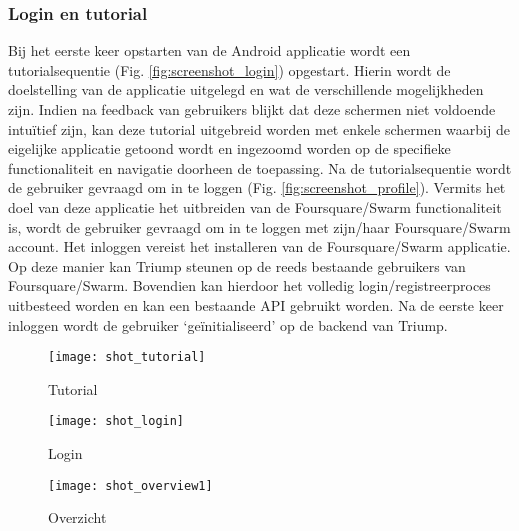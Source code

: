 \subsubsection{Login en tutorial} %
Bij het eerste keer opstarten van de Android applicatie wordt een tutorialsequentie (Fig. \ref{fig:screenshot_login}) opgestart. Hierin wordt de doelstelling van de applicatie uitgelegd en wat de verschillende mogelijkheden zijn. Indien na feedback van gebruikers blijkt dat deze schermen niet voldoende intuïtief zijn, kan deze tutorial uitgebreid worden met enkele schermen waarbij de eigelijke applicatie getoond wordt en ingezoomd worden op de specifieke functionaliteit en navigatie doorheen de toepassing. 
Na de tutorialsequentie wordt de gebruiker gevraagd om in te loggen (Fig. \ref{fig:screenshot_profile}). Vermits het doel van deze applicatie het uitbreiden van de Foursquare/Swarm functionaliteit is, wordt de gebruiker gevraagd om in te loggen met zijn/haar Foursquare/Swarm account. Het inloggen vereist het installeren van de Foursquare/Swarm applicatie. Op deze manier kan Triump steunen op de reeds bestaande gebruikers van Foursquare/Swarm. Bovendien kan hierdoor het volledig login/registreerproces uitbesteed worden en kan een bestaande API gebruikt worden.
Na de eerste keer inloggen wordt de gebruiker `geïnitialiseerd' op de backend van Triump.
\begin{figure}[ht]
\begin{minipage}[b]{0.18\linewidth}
	\centering
	\texttt{[image: shot\_tutorial]}
	\caption{Tutorial}
	\label{fig:screenshot_login}
\end{minipage}
\hspace{2.4cm}
\begin{minipage}[b]{0.18\linewidth}
\centering
\texttt{[image: shot\_login]}
\caption{Login}
\label{fig:screenshot_profile}
\end{minipage}
\hspace{2.4cm}
\begin{minipage}[b]{0.18\linewidth}
\centering
\texttt{[image: shot\_overview1]}
\caption{Overzicht}
\label{fig:screenshot_overview}
\end{minipage}
\end{figure}
\clearpage
